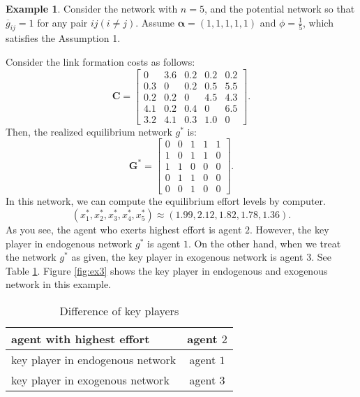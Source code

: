 \documentclass[12pt]{article}
\theoremstyle{definition}
\newtheorem{example}{Example}
\newcommand{\bm}[1]{\boldsymbol{#1}}
\begin{document}
\begin{example}
Consider the network with $n=5$, and the potential network so that $\overline{g}_{ij} = 1$ for any pair $ij(i \neq j)$.
Assume $\bm{\alpha} = (1, 1, 1, 1, 1)$ and $\phi = \frac{1}{5}$, which satisfies the Assumption 1.

Consider the link formation costs as follows:
\[\bm{C} = \left[
			\begin{array}{ccccc}
				0 & 3.6 & 0.2 & 0.2 & 0.2 \\
				0.3 & 0 & 0.2 & 0.5 & 5.5 \\
				0.2 & 0.2 & 0 & 4.5 & 4.3 \\
				4.1 & 0.2 & 0.4 & 0 & 6.5 \\
				3.2 & 4.1 & 0.3 & 1.0 & 0
			\end{array} \right]. \]
Then, the realized equilibrium network $g^*$ is:
\[\bm{G}^* = \left[
			\begin{array}{ccccc}
				0 & 0 & 1 & 1 & 1 \\
				1 & 0 & 1 & 1 & 0 \\
				1 & 1 & 0 & 0 & 0 \\
				0 & 1 & 1 & 0 & 0 \\
				0 & 0 & 1 & 0 & 0
			\end{array} \right]. \]
In this network, we can compute the equilibrium effort levels by computer.
\[ (x_1^*, x_2^*, x_3^*, x_4^*, x_5^*) \approx (1.99, 2.12, 1.82, 1.78, 1.36). \]
As you see, the agent who exerts highest effort is agent $2$.
However, the key player in endogenous network $g^*$ is agent $1$.
On the other hand, when we treat the network $g^*$ as given, the key player in exogenous network is agent $3$.
See Table \ref{tab:key player}.
Figure \ref{fig:ex3} shows the key player in endogenous and exogenous network in this example.

\begin{table}[htb]
  \begin{center}
    \begin{tabular}{|l|c|} \hline
      agent with highest effort & agent $2$ \\ \hline
      key player in endogenous network & agent $1$ \\ \hline
      key player in exogenous network & agent $3$ \\ \hline
    \end{tabular}
    \caption{Difference of key players}
    \label{tab:key player}
  \end{center}
\end{table}
\end{example}
\end{document}
